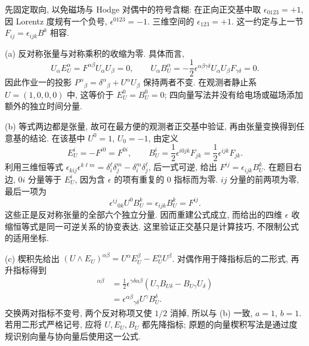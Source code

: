 \begin{solution}
先固定取向, 以免磁场与 Hodge 对偶中的符号含糊: 在正向正交基中取 $\epsilon_{0123}=+1$, 因 Lorentz 度规有一个负号, $\epsilon^{0123}=-1$. 三维空间的 $\epsilon_{123}=+1$. 这一约定与上一节 $F_{ij}=\epsilon_{ijk}B^k$ 相容.

(a) 反对称张量与对称乘积的收缩为零. 具体而言,
\[
 U_\alpha E_U^\alpha=F^{\alpha\beta}U_\alpha U_\beta=0,
 \qquad
 U_\alpha B_U^\alpha=-\frac12\epsilon^{\alpha\beta\gamma\delta}
 U_\alpha U_\beta F_{\gamma\delta}=0.
\]
因此作业一的投影 $P^\alpha{}_{\beta}=\delta^\alpha{}_{\beta}+U^\alpha U_\beta$ 保持两者不变. 在观测者静止系 $U=(1,0,0,0)$ 中, 这等价于 $E_U^0=B_U^0=0$; 四向量写法并没有给电场或磁场添加额外的独立时间分量.

(b) 等式两边都是张量, 故可在最方便的观测者正交基中验证, 再由张量变换得到任意基的结论. 在该基中 $U^0=1$, $U_0=-1$, 由定义
\[
 E_U^i=-F^{i0}=F^{0i},\qquad
 B_U^i=\frac12\epsilon^{i0jk}F_{jk}
 =\frac12\epsilon^{ijk}F_{jk}.
\]
利用三维恒等式 $\epsilon_{kij}\epsilon^{k\ell m}=\delta_i^\ell\delta_j^m-\delta_i^m\delta_j^\ell$, 后一式可逆, 给出 $F^{ij}=\epsilon_{ijk}B_U^k$. 在题目右边, $0i$ 分量等于 $E_U^i$, 因为含 $\epsilon$ 的项有重复的 0 指标而为零. $ij$ 分量的前两项为零, 最后一项为
\[
 \epsilon^{ij}{}_{0k}U^0B_U^k=\epsilon_{ijk}B_U^k=F^{ij}.
\]
这些正是反对称张量的全部六个独立分量. 因而重建公式成立, 而给出的四维 $\epsilon$ 收缩恒等式是同一可逆关系的协变表达. 这里验证正交基只是计算技巧, 不限制公式的适用坐标.

(c) 楔积先给出 $(U\wedge E_U)^{\alpha\beta}=U^\alpha E_U^\beta-E_U^\alpha U^\beta$. 对偶作用于降指标后的二形式, 再升指标得到
\begin{align*}
 [ {}^*(U\wedge B_U)]^{\alpha\beta}
 &=\frac12\epsilon^{\gamma\delta\alpha\beta}
 (U_\gamma B_{U\delta}-B_{U\gamma}U_\delta)\\
 &=\epsilon^{\alpha\beta}{}_{\gamma\delta}U^\gamma B_U^\delta.
\end{align*}
交换两对指标不变号, 两个反对称项又使 $1/2$ 消掉, 所以与 (b) 一致, $a=1$, $b=1$. 若用二形式严格记号, 应将 $U,E_U,B_U$ 都先降指标; 原题的向量楔积写法是通过度规识别向量与协向量后使用这一公式.
\end{solution}

